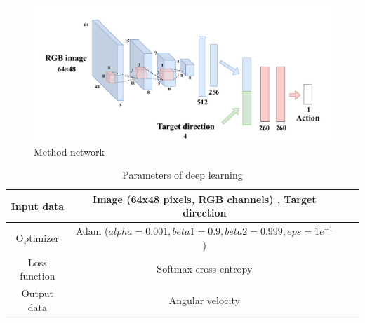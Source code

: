 \begin{figure}[h]
    \centering
    \includegraphics[width = 13cm]{./figs/method_network.pdf}
    \caption{Method network}
    \label{fig::methodnetwork}
\end{figure}
\begin{table}[htb]
    \centering
    \caption{Parameters of deep learning}
    \begin{tabular}{|c|c|c|c|}
    \hline
    Input data    & Image (64x48 pixels, RGB channels) , Target direction                                             \\ \hline
    Optimizer     & Adam ($alpha = 0.001, beta1 = 0.9, beta2 = 0.999, eps = 1e^{-1}$ )  \\ \hline
    Loss function & Softmax-cross-entropy                                                            \\ \hline
    Output data   & Angular velocity                                              \\ \hline
    \end{tabular}
    \label{tb::param}
    \end{table}





